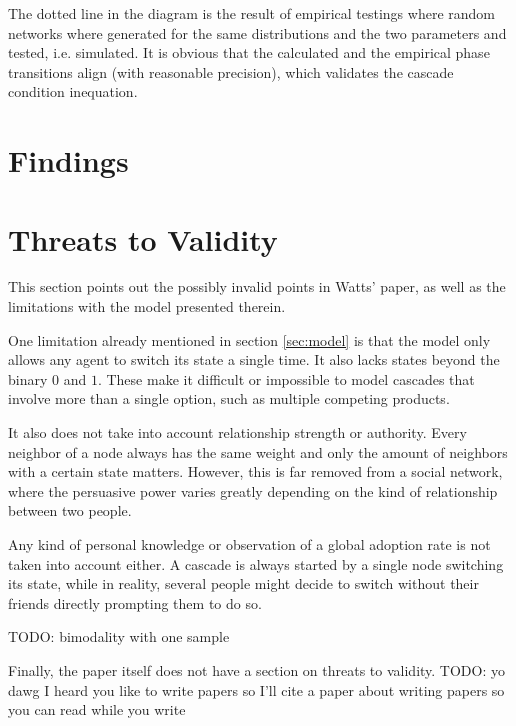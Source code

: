 \documentclass{sig-alternate-05-2015}
\begin{document}
The dotted line in the diagram is the result of empirical testings where random networks where generated for the same distributions and the two parameters and tested, i.e. simulated. It is obvious that the calculated and the empirical phase transitions align (with reasonable precision), which validates the cascade condition inequation.


\section{Findings}\label{sec:findings}


\section{Threats to Validity}\label{sec:threats}

This section points out the possibly invalid points in Watts' paper\cite{simplemodel}, as well as the limitations with the model presented therein.

One limitation already mentioned in section \ref{sec:model} is that the model only allows any agent to switch its state a single time. It also lacks states beyond the binary $0$ and $1$. These make it difficult or impossible to model cascades that involve more than a single option, such as multiple competing products.

It also does not take into account relationship strength or authority. Every neighbor of a node always has the same weight and only the amount of neighbors with a certain state matters. However, this is far removed from a social network, where the persuasive power varies greatly depending on the kind of relationship between two people.

Any kind of personal knowledge or observation of a global adoption rate is not taken into account either. A cascade is always started by a single node switching its state, while in reality, several people might decide to switch without their friends directly prompting them to do so.

TODO: bimodality with one sample

Finally, the paper itself does not have a section on threats to validity. TODO: yo dawg I heard you like to write papers so I'll cite a paper about writing papers so you can read while you write





\end{document}
